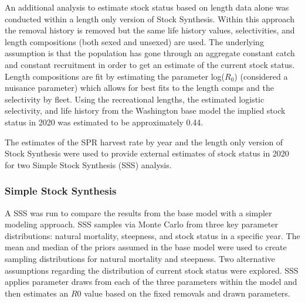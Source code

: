 \documentclass[11pt,
  english,
  a4paper,
]{article}
\begin{document}

An additional analysis to estimate stock status based on length data alone was conducted within a length only version of Stock Synthesis. Within this approach the removal history is removed but the same life history values, selectivities, and length compositions (both sexed and unsexed) are used. The underlying assumption is that the population has gone through an aggregate constant catch and constant recruitment in order to get an estimate of the current stock status. Length compositions are fit by estimating the parameter log({\(R_0\)\leavevmode\tagmcend\tagstructend}) (considered a nuisance parameter) which allows for best fits to the length comps and the selectivity by fleet. Using the recreational lengths, the estimated logistic selectivity, and life history from the Washington base model the implied stock status in 2020 was estimated to be approximately 0.44.

\leavevmode\tagmcend\tagstructend\par


The estimates of the SPR harvest rate by year and the length only version of Stock Synthesis were used to provide external estimates of stock status in 2020 for two Simple Stock Synthesis (SSS) analysis.

\leavevmode\tagmcend\tagstructend\par


\hypertarget{simple-stock-synthesis}{%
\subsubsection{Simple Stock Synthesis}\label{simple-stock-synthesis}}

\leavevmode\tagmcend\tagstructend


A SSS was run to compare the results from the base model with a simpler modeling approach. SSS samples via Monte Carlo from three key parameter distributions: natural mortality, steepness, and stock status in a specific year. The mean and median of the priors assumed in the base model were used to create sampling distributions for natural mortality and steepness. Two alternative assumptions regarding the distribution of current stock status were explored. SSS applies parameter draws from each of the three parameters within the model and then estimates an {\(R0\)\leavevmode\tagmcend\tagstructend} value based on the fixed removals and drawn parameters.
\end{document}
